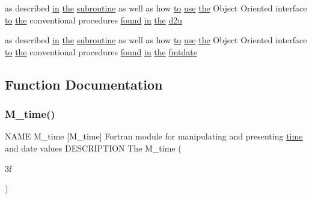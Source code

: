\begin{DoxyCompactItemize}
\item 
as described \hyperlink{M__journal_83_8txt_afce72651d1eed785a2132bee863b2f38}{in} \hyperlink{M__stopwatch_83_8txt_a0f266597de2e57eb3aa964927bb30e14}{the} \hyperlink{M__stopwatch_83_8txt_acfbcff50169d691ff02d4a123ed70482}{subroutine} as well as how \hyperlink{M__stopwatch_83_8txt_a97209fd3e34ef701c0a9734280779cbb}{to} \hyperlink{intro__blas1_83_8txt_a04fa2694d85f67a675bb3f45f7241f48}{use} \hyperlink{M__stopwatch_83_8txt_a0f266597de2e57eb3aa964927bb30e14}{the} Object Oriented interface \hyperlink{M__stopwatch_83_8txt_a97209fd3e34ef701c0a9734280779cbb}{to} \hyperlink{M__stopwatch_83_8txt_a0f266597de2e57eb3aa964927bb30e14}{the} conventional procedures \hyperlink{what__overview_81_8txt_ac0a3098bb3d5de70ed1c81da8bfd2599}{found} \hyperlink{M__journal_83_8txt_afce72651d1eed785a2132bee863b2f38}{in} \hyperlink{M__stopwatch_83_8txt_a0f266597de2e57eb3aa964927bb30e14}{the} \hyperlink{M__time_83_8txt_ab56b0f002a88dac7ff0ec59238e7aad2}{d2u}
\item 
as described \hyperlink{M__journal_83_8txt_afce72651d1eed785a2132bee863b2f38}{in} \hyperlink{M__stopwatch_83_8txt_a0f266597de2e57eb3aa964927bb30e14}{the} \hyperlink{M__stopwatch_83_8txt_acfbcff50169d691ff02d4a123ed70482}{subroutine} as well as how \hyperlink{M__stopwatch_83_8txt_a97209fd3e34ef701c0a9734280779cbb}{to} \hyperlink{intro__blas1_83_8txt_a04fa2694d85f67a675bb3f45f7241f48}{use} \hyperlink{M__stopwatch_83_8txt_a0f266597de2e57eb3aa964927bb30e14}{the} Object Oriented interface \hyperlink{M__stopwatch_83_8txt_a97209fd3e34ef701c0a9734280779cbb}{to} \hyperlink{M__stopwatch_83_8txt_a0f266597de2e57eb3aa964927bb30e14}{the} conventional procedures \hyperlink{what__overview_81_8txt_ac0a3098bb3d5de70ed1c81da8bfd2599}{found} \hyperlink{M__journal_83_8txt_afce72651d1eed785a2132bee863b2f38}{in} \hyperlink{M__stopwatch_83_8txt_a0f266597de2e57eb3aa964927bb30e14}{the} \hyperlink{M__time_83_8txt_ad50a7c3c69e1d5931a0518d62cff1ee8}{fmtdate}
\end{DoxyCompactItemize}


\subsection{Function Documentation}
\mbox{\label{M__time_83_8txt_af632c02871a2248b5e1d01c3e3293704}} 
\subsubsection{\texorpdfstring{M\+\_\+time()}{M\_time()}\hspace{0.1cm}{\footnotesize\ttfamily [1/2]}}
{\footnotesize\ttfamily N\+A\+ME M\+\_\+time \mbox{[}M\+\_\+time\mbox{]} Fortran module for manipulating and presenting \hyperlink{M__stopwatch_83_8txt_a1091fdf3a4e66042d1571c7e4ade98dd}{time} and date values D\+E\+S\+C\+R\+I\+P\+T\+I\+ON The M\+\_\+time (\begin{DoxyParamCaption}\item[{3f}]{ }\end{DoxyParamCaption})}

